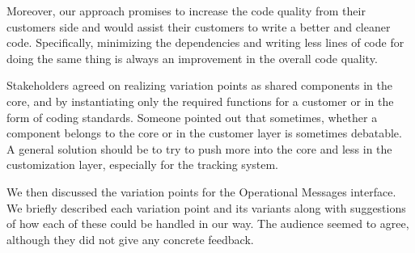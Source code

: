 
 Moreover, our approach promises to increase the code quality from their customers side and would assist their customers to write a better and cleaner code. Specifically, minimizing the dependencies and writing less lines of code for doing the same thing is always an improvement in the overall code quality.


 Stakeholders agreed on realizing variation points as shared components in the core, and by instantiating only the required functions for a customer or in the form of coding standards. 
Someone pointed out that sometimes, whether a component belongs to the core or in the customer layer is sometimes debatable. %
A general solution should be to try to push more into the core and less in the customization layer, especially for the tracking system. %

 We then discussed the variation points for the Operational Messages interface. We briefly described each variation point and its variants along with suggestions of how each of these could be handled in our way. The audience seemed to agree, although they did not give any concrete feedback. 

